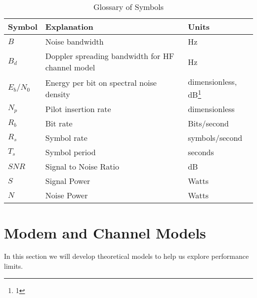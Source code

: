 \documentclass{article}
\begin{document}
\begin{table}[h]
\centering
\begin{tabular}{l l l}
 \hline
 Symbol & Explanation & Units \\
 \hline
 $B$ & Noise bandwidth & Hz \\
 $B_d$ & Doppler spreading bandwidth for HF channel model & Hz \\
 $E_b/N_0$ & Energy per bit on spectral noise density & dimensionless, dB\footnote{1} \\
 $N_p$ & Pilot insertion rate & dimensionless \\
 $R_b$ & Bit rate & Bits/second \\
 $R_s$ & Symbol rate & symbols/second \\
 $T_s$ & Symbol period & seconds \\
 $SNR$ & Signal to Noise Ratio & dB \\
 $S$ & Signal Power & Watts \\
 $N$ & Noise Power & Watts \\
 \hline
\end{tabular}
\caption{Glossary of Symbols}
\end{table}


\clearpage

\section{Modem and Channel Models}

In this section we will develop theoretical models to help us explore performance limits.
\end{document}
